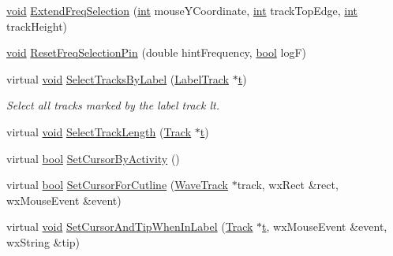 \begin{DoxyCompactItemize}
\item 
\hyperlink{sound_8c_ae35f5844602719cf66324f4de2a658b3}{void} \hyperlink{class_track_panel_a8e1f62ee006d97df0013c871df0bbb4c}{Extend\+Freq\+Selection} (\hyperlink{xmltok_8h_a5a0d4a5641ce434f1d23533f2b2e6653}{int} mouse\+Y\+Coordinate, \hyperlink{xmltok_8h_a5a0d4a5641ce434f1d23533f2b2e6653}{int} track\+Top\+Edge, \hyperlink{xmltok_8h_a5a0d4a5641ce434f1d23533f2b2e6653}{int} track\+Height)
\item 
\hyperlink{sound_8c_ae35f5844602719cf66324f4de2a658b3}{void} \hyperlink{class_track_panel_a10db23a23dec17d9c79ab80a5b68f6ed}{Reset\+Freq\+Selection\+Pin} (double hint\+Frequency, \hyperlink{mac_2config_2i386_2lib-src_2libsoxr_2soxr-config_8h_abb452686968e48b67397da5f97445f5b}{bool} logF)
\item 
virtual \hyperlink{sound_8c_ae35f5844602719cf66324f4de2a658b3}{void} \hyperlink{class_track_panel_af32af2eefcb2cfde13efdd76a7749aae}{Select\+Tracks\+By\+Label} (\hyperlink{class_label_track}{Label\+Track} $\ast$\hyperlink{octave__test_8m_aaccc9105df5383111407fd5b41255e23}{t})
\begin{DoxyCompactList}\small\item\em Select all tracks marked by the label track lt. \end{DoxyCompactList}\item 
virtual \hyperlink{sound_8c_ae35f5844602719cf66324f4de2a658b3}{void} \hyperlink{class_track_panel_ae4c957bea9775488e085c370710cd566}{Select\+Track\+Length} (\hyperlink{class_track}{Track} $\ast$\hyperlink{octave__test_8m_aaccc9105df5383111407fd5b41255e23}{t})
\item 
virtual \hyperlink{mac_2config_2i386_2lib-src_2libsoxr_2soxr-config_8h_abb452686968e48b67397da5f97445f5b}{bool} \hyperlink{class_track_panel_a16f030d9d1ef9352ca6f0405aa9d52f1}{Set\+Cursor\+By\+Activity} ()
\item 
virtual \hyperlink{mac_2config_2i386_2lib-src_2libsoxr_2soxr-config_8h_abb452686968e48b67397da5f97445f5b}{bool} \hyperlink{class_track_panel_a2a9f4c3f7d9e69e93b52b013f5608b9b}{Set\+Cursor\+For\+Cutline} (\hyperlink{class_wave_track}{Wave\+Track} $\ast$track, wx\+Rect \&rect, wx\+Mouse\+Event \&event)
\item 
virtual \hyperlink{sound_8c_ae35f5844602719cf66324f4de2a658b3}{void} \hyperlink{class_track_panel_a602ea41daa207e8731cf277fdc90a5b3}{Set\+Cursor\+And\+Tip\+When\+In\+Label} (\hyperlink{class_track}{Track} $\ast$\hyperlink{octave__test_8m_aaccc9105df5383111407fd5b41255e23}{t}, wx\+Mouse\+Event \&event, wx\+String \&tip)

\end{DoxyCompactItemize}
